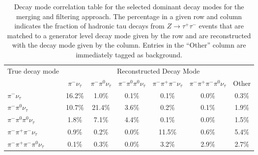 
\begin{table}[htp]
   \centering
   \begin{tabular}{l|cccccc}

\multirow{2}{*}{True decay mode} & \multicolumn{6}{c}{Reconstructed Decay Mode}\\

 & $\pi^{-}\nu_\tau$ & $\pi^{-}\pi^0\nu_\tau$ & $\pi^{-}\pi^0\pi^0\nu_\tau$ & $\pi^{-}\pi^{+}\pi^{-}\nu_\tau$ & $\pi^{-}\pi^{+}\pi^{-}\pi^0\nu_\tau$& Other \\
\hline
$\pi^{-}\nu_\tau$ & 16.2\% &1.0\% &0.1\% &0.1\% &0.0\% & 0.3\% \\
$\pi^{-}\pi^0\nu_\tau$ & 10.7\% &21.4\% &3.6\% &0.2\% &0.1\% & 1.9\% \\
$\pi^{-}\pi^0\pi^0\nu_\tau$ & 1.8\% &7.1\% &4.4\% &0.1\% &0.0\% & 1.5\% \\
$\pi^{-}\pi^{+}\pi^{-}\nu_\tau$ & 0.9\% &0.2\% &0.0\% &11.5\% &0.6\% & 5.4\% \\
$\pi^{-}\pi^{+}\pi^{-}\pi^0\nu_\tau$ & 0.1\% &0.3\% &0.0\% &3.2\% &2.9\% & 2.7\% \\

\end{tabular}
\label{tab:dmResolutionStandard} \caption[Decay mode performance -- TaNC
reconstruction]{Decay mode correlation table for the selected dominant decay
modes for the merging and filtering approach.  The percentage in a given row and
column indicates the fraction of hadronic tau decays from
\mbox{$Z\to\tau^{+}\tau^{-}$} events that are matched to a generator level
decay mode given by the row and are reconstructed with the decay mode given by
the column.  Entries in the ``Other'' column are immediately tagged as background.
}
\end{table}

